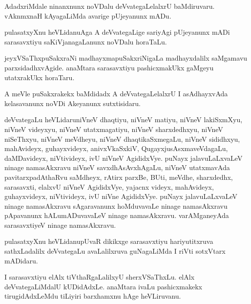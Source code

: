 \begin{mng}
AdadxriMdale ninanxnunx noVDalu deVvategaLelalxrU baMdiruvaru. vAknmxnaH kAyagaLiMda avarige pUjeyanunx mADu.
\end{mng}

\begin{mng}
pulasatxyXnu heVLidanu\mdash Aga A deVvategaLige sariyAgi pUjeyanunx mADi sarasavxtiyu saKiVjanagaLanunx noVDalu horaTaLu.
\end{mng}

\begin{mng}
jeyxVSaThxpuSakxraNi madhayxmapuSakxriNigaLa madhayxdalilx saMgamavu parxsidadhxvAgide. anaMtara sarasavxtiyu pashicxmakUkx gaMgeyu utatxrakUkx horaTaru.
\end{mng}

\begin{mng}
A meVle puSakxrakekx baMdidadx A deVvategaLelalxrU I asAdhayxvAda kelasavanunx noVDi Akeyanunx sutxtisidaru.
\end{mng}

\begin{mng}
deVvategaLu heVLidaru\mdash niVneV dhaqtiyu, niVneV matiyu, niVneV lakiSxmXyu, niVneV videyxyu, niVneV utatxmagatiyu, niVneV sharxdedhxyu, niVneV niSeThxyu, niVneV meVdheyu, niVneV dhaqtikaSxmegaLu, niVneV sididhxyu, mahAvideyx, guhayxvideyx, anivxVkaSxkiV, QugayxjusAsxmaveVdagaLu, daMDavideyx, niVtivideyx, ivU niVneV AgididxVye. puNayx jalavuLaLxvaLeV ninage namasAkxravu niVneV savxdhAsAvxhAgaLu, niVneV utatxmavAda pavitarxpadAthaRvu saMdheyx, rAtirx parxBe, BUti, meVdhe, sharxdedhx, sarasavxti, elalxvU niVneV AgididxVye, yajacnx videyx, mahAvideyx, guhayxvideyx, niVtivideyx, ivU niVne AgididxVye. puNayx jalavuLaLxvaLeV ninage namasAkxravu sAgaravanunx hoMduvavaLe ninage namasAkxravu pApavanunx hALumADuvavaLeV ninage namasAkxravu. varAMganeyAda sarasavxtiyeV ninage namasAkxravu.
\end{mng}

\begin{mng}
pulasatxyXnu heVLidanu\mdash pUvaR dikikxge sarasavxtiyu hariyutitxruva sathxLadalilx deVvategaLu avaLalilxruva guNagaLiMda I riVti sotxVtarx mADidaru.
\end{mng}

\begin{mng}
I sarasavxtiyu elAlx tiVthaRgaLalilxyU sherxVSaThxLu. elAlx deVvategaLiMdalU kUDidAdxLe. anaMtara ivaLu pashicxmakekx tirugidAdxLeMdu tiLiyiri barxhamxnu hAge heVLiruvanu.
\end{mng}

